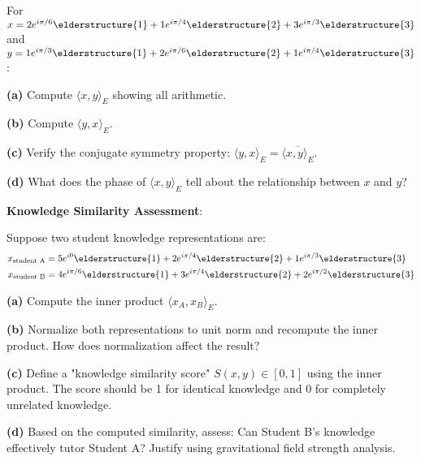 \begin{exercise}
For $x = 2e^{i\pi/6}\elderstructure{1} + 1e^{i\pi/4}\elderstructure{2} + 3e^{i\pi/3}\elderstructure{3}$ and $y = 1e^{i\pi/3}\elderstructure{1} + 2e^{i\pi/6}\elderstructure{2} + 1e^{i\pi/4}\elderstructure{3}$:

\textbf{(a)} Compute $\langle x, y \rangle_E$ showing all arithmetic.

\textbf{(b)} Compute $\langle y, x \rangle_E$.

\textbf{(c)} Verify the conjugate symmetry property: $\langle y, x \rangle_E = \overline{\langle x, y \rangle_E}$.

\textbf{(d)} What does the phase of $\langle x, y \rangle_E$ tell about the relationship between $x$ and $y$?
\end{exercise}

\begin{application}
\textbf{Knowledge Similarity Assessment}:

Suppose two student knowledge representations are:
\begin{align}
x_{\text{student A}} &= 5e^{i0}\elderstructure{1} + 2e^{i\pi/4}\elderstructure{2} + 1e^{i\pi/3}\elderstructure{3} \\
x_{\text{student B}} &= 4e^{i\pi/6}\elderstructure{1} + 3e^{i\pi/4}\elderstructure{2} + 2e^{i\pi/2}\elderstructure{3}
\end{align}

\textbf{(a)} Compute the inner product $\langle x_A, x_B \rangle_E$.

\textbf{(b)} Normalize both representations to unit norm and recompute the inner product. How does normalization affect the result?

\textbf{(c)} Define a "knowledge similarity score" $S(x,y) \in [0,1]$ using the inner product. The score should be 1 for identical knowledge and 0 for completely unrelated knowledge.

\textbf{(d)} Based on the computed similarity, assess: Can Student B's knowledge effectively tutor Student A? Justify using gravitational field strength analysis.
\end{application}

